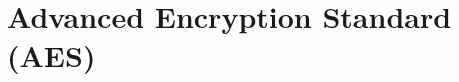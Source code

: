 \documentclass[../main.tex]{subfiles}
\begin{document}
\chapter{Advanced Encryption Standard (AES)}
\end{document}
